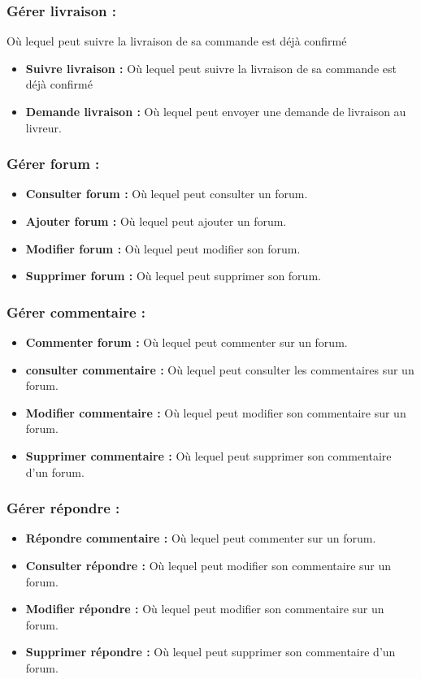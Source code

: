\documentclass[16pt,fleqn]{article} %
\begin{document}
\subsubsection{Gérer livraison :}
Où lequel peut suivre la livraison de sa commande est déjà confirmé
\begin{itemize}
        \item \textbf{Suivre livraison :} Où lequel peut suivre la livraison de sa commande est déjà confirmé
        \item \textbf{Demande livraison :} Où lequel peut envoyer une demande de livraison au livreur.
    \end{itemize}

\subsubsection{Gérer forum :}
    \begin{itemize}
        \item \textbf{Consulter forum :} Où lequel peut consulter un forum.
        \item \textbf{Ajouter forum :} Où lequel peut ajouter un forum.
        \item \textbf{Modifier forum :} Où lequel peut modifier son forum.
        \item \textbf{Supprimer forum :} Où lequel peut supprimer son forum.
    \end{itemize}
    
\subsubsection{Gérer commentaire :}
    \begin{itemize}
        \item \textbf{Commenter forum :} Où lequel peut commenter sur un forum.
        \item \textbf{consulter commentaire :} Où lequel peut consulter les commentaires sur un forum.
        \item \textbf{Modifier commentaire :} Où lequel peut modifier son commentaire sur un forum.
        \item \textbf{Supprimer commentaire :} Où lequel peut supprimer son commentaire d'un forum.
    \end{itemize}
    
\subsubsection{Gérer répondre :}
    \begin{itemize}
        \item \textbf{Répondre commentaire :} Où lequel peut commenter sur un forum.
        \item \textbf{Consulter répondre :} Où lequel peut modifier son commentaire sur un forum.
        \item \textbf{Modifier répondre :} Où lequel peut modifier son commentaire sur un forum.
        \item \textbf{Supprimer répondre :} Où lequel peut supprimer son commentaire d'un forum.
    \end{itemize}  
    
\end{document}
